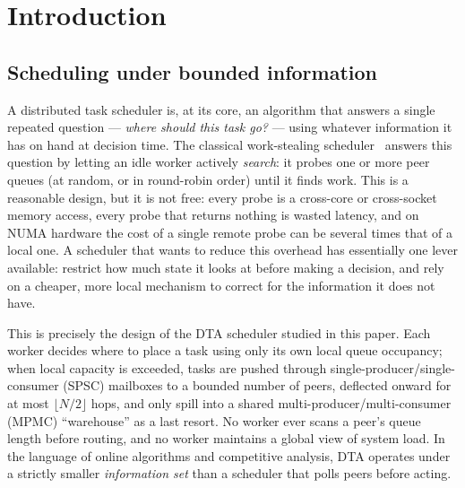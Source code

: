 \documentclass[11pt,a4paper]{article}
\begin{document}
\section*{Introduction}
\label{sec:intro}

\subsection*{Scheduling under bounded information}

A distributed task scheduler is, at its core, an algorithm that answers a
single repeated question --- \emph{where should this task go?} --- using
whatever information it has on hand at decision time.  The classical
work-stealing scheduler~\cite{blumofe1999,arora2001,tokio} answers this
question by letting an idle worker actively \emph{search}: it probes one
or more peer queues (at random, or in round-robin order) until it finds
work.  This is a reasonable design, but it is not free: every probe is a
cross-core or cross-socket memory access, every probe that returns nothing
is wasted latency, and on NUMA hardware the cost of a single remote probe
can be several times that of a local one. A scheduler that wants to reduce
this overhead has essentially one lever available: restrict how much
state it looks at before making a decision, and rely on a cheaper, more
local mechanism to correct for the information it does not have.

This is precisely the design of the \textsc{DTA} scheduler studied in
this paper. Each worker decides where to place a task using only its own
local queue occupancy; when local capacity is exceeded, tasks are pushed
through single-producer/single-consumer (SPSC) mailboxes to a bounded
number of peers, deflected onward for at most $\lfloor N/2 \rfloor$ hops,
and only spill into a shared multi-producer/multi-consumer (MPMC)
``warehouse'' as a last resort. No worker ever scans a peer's queue length
before routing, and no worker maintains a global view of system load. In
the language of online algorithms and competitive analysis, DTA operates
under a strictly smaller \emph{information set} than a scheduler that
polls peers before acting.
\end{document}
